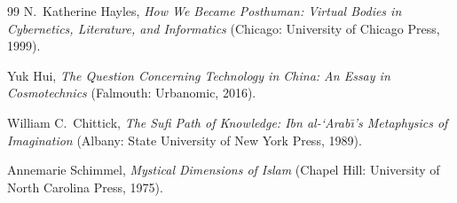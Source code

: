 \documentclass[11pt]{article}
\begin{document}
\begin{thebibliography}{99}
 N.\ Katherine Hayles, \emph{How We Became Posthuman: Virtual Bodies in Cybernetics, Literature, and Informatics} (Chicago: University of Chicago Press, 1999).

 Yuk Hui, \emph{The Question Concerning Technology in China: An Essay in Cosmotechnics} (Falmouth: Urbanomic, 2016).

 William C.\ Chittick, \emph{The Sufi Path of Knowledge: Ibn al-`Arab\={\i}'s Metaphysics of Imagination} (Albany: State University of New York Press, 1989).

 Annemarie Schimmel, \emph{Mystical Dimensions of Islam} (Chapel Hill: University of North Carolina Press, 1975).

\end{thebibliography}
\end{document}
